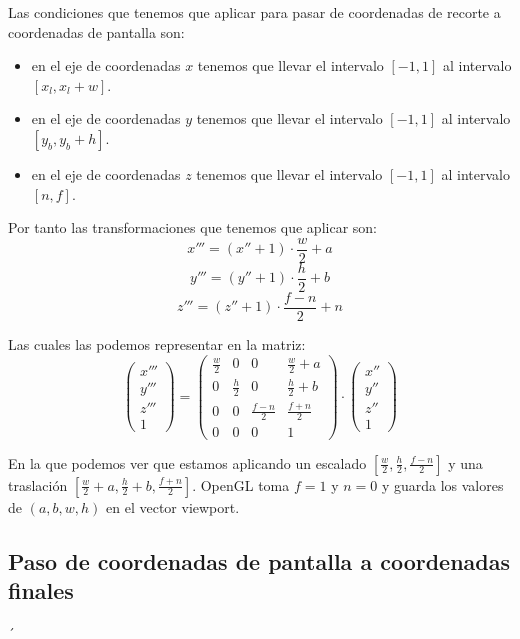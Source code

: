 \documentclass[a4paper,11pt, oneside]{book}
\begin{document}
Las condiciones que tenemos que aplicar para pasar de coordenadas de recorte a coordenadas de pantalla son:
\begin{itemize}
	\item en el eje de coordenadas $x$ tenemos que llevar el intervalo $[-1,1]$ al intervalo $[x_l, x_l+w]$.
	\item en el eje de coordenadas $y$ tenemos que llevar el intervalo $[-1,1]$ al intervalo $[y_b, y_b+h]$.
	\item en el eje de coordenadas $z$ tenemos que llevar el intervalo $[-1,1]$ al intervalo $[n, f]$.
\end{itemize}

Por tanto las transformaciones que tenemos que aplicar son:
\begin{equation}
x''' = (x''+1)\cdot \frac{w}{2}+a
\end{equation}
\begin{equation}
y''' = (y''+1)\cdot \frac{h}{2}+b
\end{equation}
\begin{equation}
z''' = (z''+1)\cdot \frac{f-n}{2}+n
\end{equation}

Las cuales las podemos representar en la matriz:
\begin{equation}
\begin{pmatrix}
x'''\\
y'''\\
z'''\\
1
\end{pmatrix} =
\begin{pmatrix}
\frac{w}{2} &0&0&\frac{w}{2}+a\\
0&\frac{h}{2} &0&\frac{h}{2}+b\\
0&0&\frac{f-n}{2} & \frac{f+n}{2}\\
0&0&0&1
\end{pmatrix}
\cdot \begin{pmatrix}
x''\\
y''\\
z''\\
1
\end{pmatrix}
\end{equation}

En la que podemos ver que estamos aplicando un escalado $[\frac{w}{2}, \frac{h}{2}, \frac{f-n}{2}]$ y una traslación $[\frac{w}{2}+a, \frac{h}{2}+b, \frac{f+n}{2}]$. OpenGL toma $f=1$ y $n=0$ y guarda los valores de $(a,b,w,h)$ en el vector viewport. 

\subsection{Paso de coordenadas de pantalla a coordenadas finales}´
\end{document}
